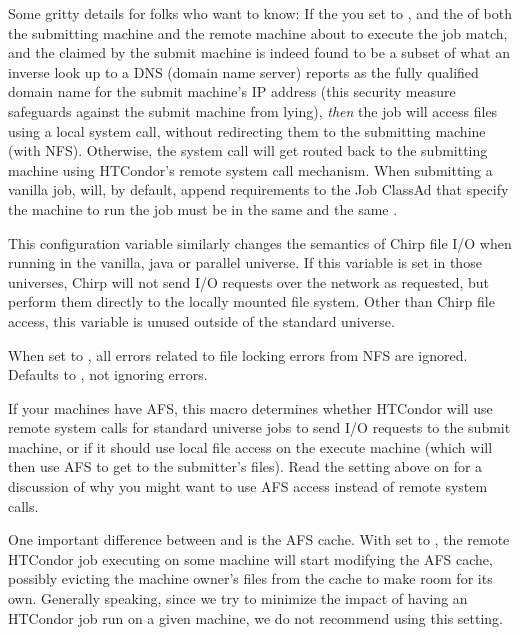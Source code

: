 \begin{description}
  Some gritty details for folks who want to know: If the you set
   to , and the  of
  both the submitting machine and the remote machine about to execute
  the job match, and the  claimed by the
  submit machine is indeed found to be a subset of what an inverse
  look up to a DNS (domain name server) reports as the fully qualified
  domain name for the submit machine's IP address (this security
  measure safeguards against the submit machine from lying),
  \emph{then} the job will access files using a local system call,
  without redirecting them to the submitting machine (with
  NFS).  Otherwise, the system call will get routed back to the
  submitting machine using HTCondor's remote system call mechanism.
  \Note When submitting a vanilla job,  will, by default,
  append requirements to the Job ClassAd that specify the machine to run
  the job must be in the same  and the same
  .

  This configuration variable similarly changes the semantics of Chirp file I/O
  when running in the vanilla, java or parallel universe.  
  If this variable is set in those universes, Chirp will not send I/O requests 
  over the network as requested, 
  but perform them directly to the locally mounted file system.  
  Other than Chirp file access, this variable is unused
  outside of the standard universe.

\label{param:IgnoreNFSLockErrors}
\item[\Macro{IGNORE\_NFS\_LOCK\_ERRORS}]
  When set to , all errors related to file locking errors from
  NFS are ignored.
  Defaults to , not ignoring errors.
  
\label{param:UseAfs}
\item[\Macro{USE\_AFS}]
  If your machines have AFS,
  this macro determines whether HTCondor will use remote system calls for
  standard universe jobs to send I/O requests to the submit machine,
  or if it should use local file access on the execute machine (which
  will then use AFS to get to the submitter's files).  Read the
  setting above on  for a discussion of why you might
  want to use AFS access instead of remote system calls.
  
  One important difference between  and
   is the AFS cache.  With  set to
  , the remote HTCondor job executing on some machine will start
  modifying the AFS cache, possibly evicting the machine owner's
  files from the cache to make room for its own.  Generally speaking,
  since we try to minimize the impact of having an HTCondor job run on a
  given machine, we do not recommend using this setting.


\end{description}
